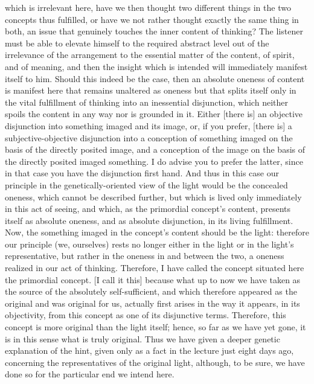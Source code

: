 which is irrelevant here,
have we then thought two different things
in the two concepts thus fulfilled,
or have we not rather thought exactly the same thing in both,
an issue that genuinely touches the inner content of thinking?
The listener must be able to elevate himself
to the required abstract level
out of the irrelevance of the arrangement
to the essential matter of the content,
of spirit, and of meaning, and
then the insight which is intended will
immediately manifest itself to him.
Should this indeed be the case,
then an absolute oneness of content is
manifest here that remains unaltered as oneness
but that splits itself only in
the vital fulfillment of
thinking into an inessential disjunction,
which neither spoils the content
in any way nor is grounded in it.
Either [there is] an objective disjunction
into something imaged and its image,
or, if you prefer, [there is]
a subjective-objective disjunction
into a conception of something imaged
on the basis of the directly posited image,
and a conception of the image on the basis of
the directly posited imaged something.
I do advise you to prefer the latter,
since in that case you have
the disjunction first hand.
And thus in this case our principle
in the genetically-oriented view of the light
would be the concealed oneness,
which cannot be described further,
but which is lived only immediately
in this act of seeing, and which,
as the primordial concept's content,
presents itself as absolute oneness,
and as absolute disjunction,
in its living fulfillment.
Now, the something imaged
in the concept's content
should be the light:
therefore our principle (we, ourselves)
rests no longer either in the light
or in the light's representative,
but rather in the oneness in and between the two,
a oneness realized in our act of thinking.
Therefore, I have called the concept situated here
the primordial concept.
[I call it this] because what up to now
we have taken as the source
of the absolutely self-sufficient,
and which therefore appeared as the original
and was original for us,
actually first arises in the way it appears,
in its objectivity,
from this concept
as one of its disjunctive terms.
Therefore, this concept is more original
than the light itself;
hence, so far as we have yet gone,
it is in this sense what is truly original.
Thus we have given a deeper genetic explanation of the hint,
given only as a fact in the lecture just eight days ago,
concerning the representatives of the original light,
although, to be sure, we have done so
for the particular end we intend here.

